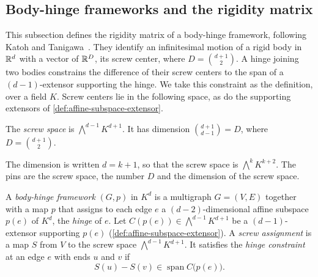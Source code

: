 \subsection{Body-hinge frameworks and the rigidity matrix}
\label{sec:molecular-rigidity-matrix-def}

This subsection defines the rigidity matrix of a body-hinge framework,
following Katoh and Tanigawa~\cite[\S\S2.2--2.4]{katohTanigawa2011}.
They identify an infinitesimal motion of a rigid body in ${\mathbb{R}}^d$ with a
vector of ${\mathbb{R}}^D$, its screw center, where $D = \binom{d+1}{2}$. A hinge
joining two bodies constrains the difference of their screw centers to
the span of a $(d-1)$-extensor supporting the hinge. We take this
constraint as the definition, over a field $K$. Screw centers lie in
the following space, as do the supporting extensors of
\cref{def:affine-subspace-extensor}.

\begin{definition}
  \label{def:screw-space}
  \leanok
  The \emph{screw space} is $\bigwedge^{d-1}K^{d+1}$. It has dimension
  $\binom{d+1}{d-1} = D$, where $D = \binom{d+1}{2}$.
\end{definition}

\begin{fmlnote}
  The dimension is written $d = k + 1$, so that the screw space is
  $\bigwedge^k K^{k+2}$. The pins are the screw space, the number $D$
  and the dimension of the screw space.
\end{fmlnote}

\begin{definition}
  \label{def:hinge-constraint}
  \leanok
  A \emph{body-hinge framework} $(G,p)$ in $K^d$ is a multigraph
  $G = (V,E)$ together with a map $p$ that assigns to each edge $e$ a
  $(d-2)$-dimensional affine subspace $p(e)$ of $K^d$, the \emph{hinge}
  of $e$. Let $C(p(e)) \in \bigwedge^{d-1}K^{d+1}$ be a
  $(d-1)$-extensor supporting $p(e)$
  (\cref{def:affine-subspace-extensor}). A \emph{screw assignment} is a
  map $S$ from $V$ to the screw space $\bigwedge^{d-1}K^{d+1}$. It
  satisfies the \emph{hinge constraint} at an edge $e$ with ends $u$
  and $v$ if
  \[
    S(u) - S(v) \in \operatorname{span} C\bigl(p(e)\bigr).
  \]
\end{definition}

